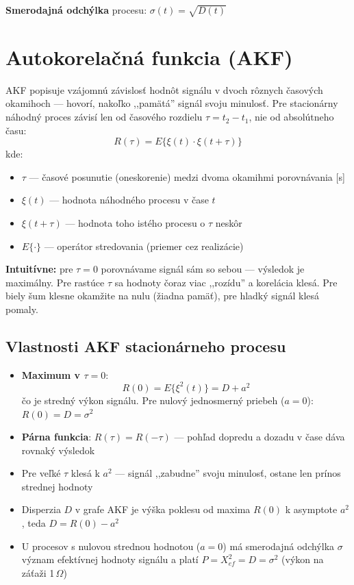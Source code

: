 \textbf{Smerodajná odchýlka} procesu: $\sigma(t) = \sqrt{D(t)}$

\section{Autokorelačná funkcia (AKF)}

AKF popisuje vzájomnú závislosť hodnôt signálu v dvoch rôznych časových
okamihoch --- hovorí, nakoľko ,,pamätá'' signál svoju minulosť. Pre
stacionárny náhodný proces závisí len od časového rozdielu $\tau = t_2 - t_1$,
nie od absolútneho času:
\[
  R(\tau) = E\{\xi(t) \cdot \xi(t+\tau)\}
\]
kde:
\begin{itemize}
  \item $\tau$ --- časové posunutie (oneskorenie) medzi dvoma okamihmi
        porovnávania [s]
  \item $\xi(t)$ --- hodnota náhodného procesu v čase $t$
  \item $\xi(t+\tau)$ --- hodnota toho istého procesu o $\tau$ neskôr
  \item $E\{\cdot\}$ --- operátor stredovania (priemer cez realizácie)
\end{itemize}

\textbf{Intuitívne:} pre $\tau = 0$ porovnávame signál sám so sebou ---
výsledok je maximálny. Pre rastúce $\tau$ sa hodnoty čoraz viac ,,rozídu''
a korelácia klesá. Pre biely šum klesne okamžite na nulu (žiadna pamäť), pre
hladký signál klesá pomaly.

\subsection{Vlastnosti AKF stacionárneho procesu}

\begin{itemize}
  \item \textbf{Maximum v $\tau = 0$}:
    \[
      R(0) = E\{\xi^2(t)\} = D + a^2
    \]
    čo je stredný výkon signálu. Pre nulový jednosmerný priebeh ($a = 0$):
    $R(0) = D = \sigma^2$
  \item \textbf{Párna funkcia}: $R(\tau) = R(-\tau)$ --- pohľad dopredu
        a dozadu v čase dáva rovnaký výsledok
  \item Pre veľké $\tau$ klesá k $a^2$ --- signál ,,zabudne'' svoju minulosť,
        ostane len prínos strednej hodnoty
  \item Disperzia $D$ v grafe AKF je výška poklesu od maxima $R(0)$
        k asymptote $a^2$, teda $D = R(0) - a^2$
  \item U procesov s nulovou strednou hodnotou ($a = 0$) má smerodajná
        odchýlka $\sigma$ význam efektívnej hodnoty signálu a platí
        $P = X_{ef}^2 = D = \sigma^2$ (výkon na záťaži 1\,$\Omega$)
\end{itemize}

